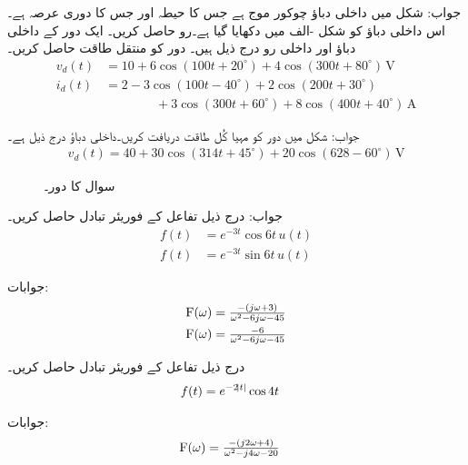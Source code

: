 جواب:
شکل  میں داخلی دباؤ چوکور موج ہے جس کا حیطہ  اور جس کا دوری عرصہ  ہے۔اس داخلی دباؤ کو شکل -الف میں دکھایا گیا ہے۔رو  حاصل کریں۔
ایک دور کے داخلی دباؤ اور داخلی رو درج ذیل ہیں۔ دور کو منتقل طاقت حاصل کریں۔
\begin{align*}
v_d(t)&=10+6\cos(100t+20^{\circ})+4\cos(300t+80^{\circ})\,\si{\volt}\\
i_d(t)&=2-3\cos(100t-40^{\circ})+2\cos(200t+30^{\circ})\\
&\quad \quad\quad\quad +3\cos(300t+60^{\circ})+8\cos(400t+40^{\circ})\,\si{\ampere}
\end{align*} 

جواب:
شکل  میں دور کو مہیا کُل طاقت دریافت کریں۔داخلی دباؤ درج ذیل ہے۔
\begin{align*}
v_d(t)=40+30\cos(314t+45^{\circ})+20\cos(628-60^{\circ})\,\si{\volt}
\end{align*}
% 
\begin{figure}
\centering
{}
\caption{سوال  کا دور۔}
\label{شکل_سوال_فوریئر_حل_دور_ت}
\end{figure}

جواب:
درج ذیل تفاعل کے فوریئر تبادل حاصل کریں۔
\begin{align*}
f(t)&=e^{-3t}\cos 6t \, u(t)\\
f(t)&=e^{-3t}\sin 6t \, u(t)
\end{align*}

جوابات:
\begin{align*}
{\ensuremath{{\textup{F}}}}(\omega)&=\tfrac{-(j\omega +3)}{\omega^2-6j\omega-45}\\
{{\textup{F}}}(\omega)&=\tfrac{-6}{\omega^2-6j\omega-45}
\end{align*}

درج ذیل تفاعل کے فوریئر تبادل حاصل کریں۔
\begin{align*}
f(t)&=e^{-2\abs{t}}\cos 4t
\end{align*}

جوابات:
\begin{align*}
{\ensuremath{{\textup{F}}}}(\omega)&=\tfrac{-(j2\omega+4)}{\omega^2-j4\omega-20}
\end{align*}
